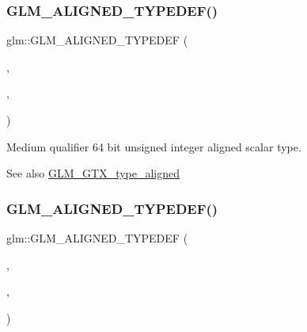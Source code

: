 \subsubsection{\texorpdfstring{G\+L\+M\+\_\+\+A\+L\+I\+G\+N\+E\+D\+\_\+\+T\+Y\+P\+E\+D\+E\+F()}{GLM\_ALIGNED\_TYPEDEF()}\hspace{0.1cm}{\footnotesize\ttfamily [84/209]}}
{\footnotesize\ttfamily glm\+::\+G\+L\+M\+\_\+\+A\+L\+I\+G\+N\+E\+D\+\_\+\+T\+Y\+P\+E\+D\+EF (\begin{DoxyParamCaption}\item[{\mbox{\hyperlink{group__gtc__type__precision_ga6685788d15d0a973ee7c2460d0456dc1}{mediump\+\_\+uint64}}}]{,  }\item[{aligned\+\_\+mediump\+\_\+uint64}]{,  }\item[{8}]{ }\end{DoxyParamCaption})}

Medium qualifier 64 bit unsigned integer aligned scalar type. \begin{DoxySeeAlso}{See also}
\mbox{\hyperlink{group__gtx__type__aligned}{G\+L\+M\+\_\+\+G\+T\+X\+\_\+type\+\_\+aligned}} 
\end{DoxySeeAlso}
\mbox{\label{group__gtx__type__aligned_gaa9cde002439b74fa66120a16a9f55fcc}} 
\subsubsection{\texorpdfstring{G\+L\+M\+\_\+\+A\+L\+I\+G\+N\+E\+D\+\_\+\+T\+Y\+P\+E\+D\+E\+F()}{GLM\_ALIGNED\_TYPEDEF()}\hspace{0.1cm}{\footnotesize\ttfamily [85/209]}}
{\footnotesize\ttfamily glm\+::\+G\+L\+M\+\_\+\+A\+L\+I\+G\+N\+E\+D\+\_\+\+T\+Y\+P\+E\+D\+EF (\begin{DoxyParamCaption}\item[{\mbox{\hyperlink{group__gtc__type__precision_gadfa38f3c245d371c4b2079f1fd68928b}{mediump\+\_\+uint8\+\_\+t}}}]{,  }\item[{aligned\+\_\+mediump\+\_\+uint8\+\_\+t}]{,  }\item[{1}]{ }\end{DoxyParamCaption})}

